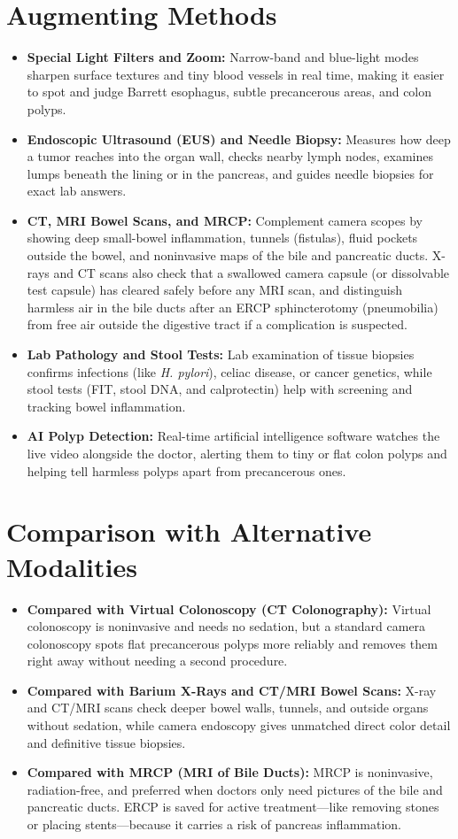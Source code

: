 \section{Augmenting Methods}
\begin{itemize}
\item \textbf{Special Light Filters and Zoom:} Narrow-band and blue-light modes sharpen surface textures and tiny blood vessels in real time, making it easier to spot and judge Barrett esophagus, subtle precancerous areas, and colon polyps.
\item \textbf{Endoscopic Ultrasound (EUS) and Needle Biopsy:} Measures how deep a tumor reaches into the organ wall, checks nearby lymph nodes, examines lumps beneath the lining or in the pancreas, and guides needle biopsies for exact lab answers.
\item \textbf{CT, MRI Bowel Scans, and MRCP:} Complement camera scopes by showing deep small-bowel inflammation, tunnels (fistulas), fluid pockets outside the bowel, and noninvasive maps of the bile and pancreatic ducts. X-rays and CT scans also check that a swallowed camera capsule (or dissolvable test capsule) has cleared safely before any MRI scan, and distinguish harmless air in the bile ducts after an ERCP sphincterotomy (pneumobilia) from free air outside the digestive tract if a complication is suspected.
\item \textbf{Lab Pathology and Stool Tests:} Lab examination of tissue biopsies confirms infections (like \textit{H. pylori}), celiac disease, or cancer genetics, while stool tests (FIT, stool DNA, and calprotectin) help with screening and tracking bowel inflammation.
\item \textbf{AI Polyp Detection:} Real-time artificial intelligence software watches the live video alongside the doctor, alerting them to tiny or flat colon polyps and helping tell harmless polyps apart from precancerous ones.
\end{itemize}

\section{Comparison with Alternative Modalities}
\begin{itemize}
\item \textbf{Compared with Virtual Colonoscopy (CT Colonography):} Virtual colonoscopy is noninvasive and needs no sedation, but a standard camera colonoscopy spots flat precancerous polyps more reliably and removes them right away without needing a second procedure.
\item \textbf{Compared with Barium X-Rays and CT/MRI Bowel Scans:} X-ray and CT/MRI scans check deeper bowel walls, tunnels, and outside organs without sedation, while camera endoscopy gives unmatched direct color detail and definitive tissue biopsies.
\item \textbf{Compared with MRCP (MRI of Bile Ducts):} MRCP is noninvasive, radiation-free, and preferred when doctors only need pictures of the bile and pancreatic ducts. ERCP is saved for active treatment---like removing stones or placing stents---because it carries a risk of pancreas inflammation.
\end{itemize}

